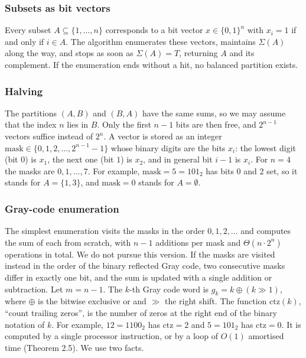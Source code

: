 \documentclass[
]{article}
\begin{document}
\hypertarget{subsets-as-bit-vectors}{%
\subsubsection{Subsets as bit vectors}\label{subsets-as-bit-vectors}}

Every subset \(A \subseteq \{1, \dots, n\}\) corresponds to a bit vector
\(x \in \{0,1\}^n\) with \(x_i = 1\) if and only if \(i \in A\). The
algorithm enumerates these vectors, maintains \(\Sigma(A)\) along the
way, and stops as soon as \(\Sigma(A) = T\), returning \(A\) and its
complement. If the enumeration ends without a hit, no balanced partition
exists.

\hypertarget{halving}{%
\subsubsection{Halving}\label{halving}}

The partitions \((A, B)\) and \((B, A)\) have the same sums, so we may
assume that the index \(n\) lies in \(B\). Only the first \(n - 1\) bits
are then free, and \(2^{n-1}\) vectors suffice instead of \(2^n\). A
vector is stored as an integer
\(\mathrm{mask} \in \{0, 1, 2, \dots, 2^{n-1} - 1\}\) whose binary
digits are the bits \(x_i\): the lowest digit (bit \(0\)) is \(x_1\),
the next one (bit \(1\)) is \(x_2\), and in general bit \(i - 1\) is
\(x_i\). For \(n = 4\) the masks are \(0, 1, \dots, 7\). For example,
\(\mathrm{mask} = 5 = 101_2\) has bits \(0\) and \(2\) set, so it stands
for \(A = \{1, 3\}\), and \(\mathrm{mask} = 0\) stands for
\(A = \emptyset\).

\hypertarget{gray-code-enumeration}{%
\subsubsection{Gray-code enumeration}\label{gray-code-enumeration}}

The simplest enumeration visits the masks in the order
\(0, 1, 2, \dots\) and computes the sum of each from scratch, with
\(n - 1\) additions per mask and \(\Theta(n \cdot 2^n)\) operations in
total. We do not pursue this version. If the masks are visited instead
in the order of the binary reflected Gray code, two consecutive masks
differ in exactly one bit, and the sum is updated with a single addition
or subtraction. Let \(m = n - 1\). The \(k\)-th Gray code word is
\(g_k = k \oplus (k \gg 1)\), where \(\oplus\) is the bitwise exclusive
or and \(\gg\) the right shift. The function \(\mathrm{ctz}(k)\),
``count trailing zeros'', is the number of zeros at the right end of the
binary notation of \(k\). For example, \(12 = 1100_2\) has
\(\mathrm{ctz} = 2\) and \(5 = 101_2\) has \(\mathrm{ctz} = 0\). It is
computed by a single processor instruction, or by a loop of \(O(1)\)
amortised time (Theorem 2.5). We use two facts.
\end{document}
